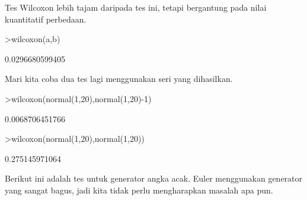 \documentclass[a4paper,10pt]{article}
\begin{document}
\begin{eulernotebook}
\begin{eulercomment}
\begin{eulercomment}
\begin{eulercomment}
Tes Wilcoxon lebih tajam daripada tes ini, tetapi bergantung pada
nilai kuantitatif perbedaan.
\end{eulercomment}
\begin{eulerprompt}
>wilcoxon(a,b)
\end{eulerprompt}
\begin{euleroutput}
  0.0296680599405
\end{euleroutput}
\begin{eulercomment}
Mari kita coba dua tes lagi menggunakan seri yang dihasilkan.
\end{eulercomment}
\begin{eulerprompt}
>wilcoxon(normal(1,20),normal(1,20)-1)
\end{eulerprompt}
\begin{euleroutput}
  0.0068706451766
\end{euleroutput}
\begin{eulerprompt}
>wilcoxon(normal(1,20),normal(1,20))
\end{eulerprompt}
\begin{euleroutput}
  0.275145971064
\end{euleroutput}
\begin{eulercomment}
Berikut ini adalah tes untuk generator angka acak. Euler menggunakan
generator yang sangat bagus, jadi kita tidak perlu mengharapkan
masalah apa pun.


\end{eulercomment}
\end{eulercomment}
\end{eulercomment}
\end{eulernotebook}
\end{document}
